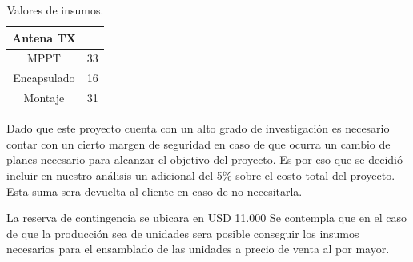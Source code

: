 \begin{table}[H]
\begin{tabular}{|c|c|}
Antena TX                                                             & \TBD                   				  \\ \hline
MPPT                                                                  & 33                                    \\ \hline
Encapsulado                                                           & 16                                    \\ \hline
Montaje                                                               & 31                                    \\ \hline
\end{tabular}
\caption{Valores de insumos.}
\end{table}


Dado que este proyecto cuenta con un alto grado de investigación es necesario contar con un cierto margen de seguridad en caso de que ocurra un cambio de planes necesario para alcanzar el objetivo del proyecto. Es por eso que se decidió incluir en nuestro análisis un adicional del 5\% sobre el costo total del proyecto. Esta suma sera devuelta al cliente en caso de no necesitarla.

La reserva de contingencia se ubicara en  USD 11.000
Se contempla que en el caso de que la producción sea de \TBD unidades sera posible conseguir los insumos necesarios para el ensamblado de las unidades a precio de venta al por mayor. 
